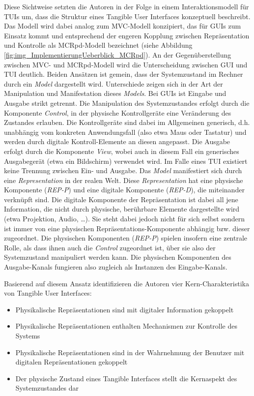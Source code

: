 Diese Sichtweise setzten die Autoren in der Folge in einem Interaktionsmodell für \glspl{TUI} um, dass die Struktur eines Tangible User Interfaces konzeptuell beschreibt. Das Modell wird dabei analog zum \gls{MVC}-Modell konzipiert, das für \glspl{GUI} zum Einsatz kommt und entsprechend der engeren Kopplung zwischen Repräsentation und Kontrolle als \gls{MCRpd}-Modell bezeichnet (siehe Abbildung \ref{fig:img_ImplementierungUeberblick_MCRpd}). An der Gegenüberstellung zwischen \gls{MVC}- und \gls{MCRpd}-Modell wird die Unterscheidung zwischen \gls{GUI} und \gls{TUI} deutlich. Beiden Ansätzen ist gemein, dass der Systemzustand im Rechner durch ein \emph{Model} dargestellt wird. Unterschiede zeigen sich in der Art der Manipulation und Manifestation dieses \emph{Models}. Bei \glspl{GUI} ist Eingabe und Ausgabe strikt getrennt. Die Manipulation des Systemzustandes erfolgt durch die Komponente \emph{Control}, in der physische Kontrollgeräte eine Veränderung des Zustandes erlauben. Die Kontrollgeräte sind dabei im Allgemeinen generisch, d.h. unabhängig vom konkreten Anwendungsfall (also etwa Maus oder Tastatur) und werden durch digitale Kontroll-Elemente an diesen angepasst. Die Ausgabe erfolgt durch die Komponente \emph{View}, wobei auch in diesem Fall ein generisches Ausgabegerät (etwa ein Bildschirm) verwendet wird. Im Falle eines \gls{TUI} existiert keine Trennung zwischen Ein- und Ausgabe. Das \emph{Model} manifestiert sich durch eine \emph{Representation} in der realen Welt. Diese \emph{Representation} hat eine physische Komponente (\emph{REP-P}) und eine digitale Komponente (\emph{REP-D}), die miteinander verknüpft sind. Die digitale Komponente der Repräsentation ist dabei all jene Information, die nicht durch physische, berührbare Elemente dargestellte wird (etwa Projektion, Audio, \ldots). Sie steht dabei jedoch nicht für sich selbst sondern ist immer von eine physischen Repräsentations-Komponente abhängig bzw. dieser zugeordnet. Die physischen Komponenten (\emph{REP-P}) spielen insofern eine zentrale Rolle, als dass ihnen auch die \emph{Control} zugeordnet ist, über sie also der Systemzustand manipuliert werden kann. Die physischen Komponenten des Ausgabe-Kanals fungieren also zugleich als Instanzen des Eingabe-Kanals.

Basierend auf diesem Ansatz identifizieren die Autoren vier Kern-Charakteristika von Tangible User Interfaces:
\begin{itemize}
	\item Physikalische Repräsentationen sind mit digitaler Information gekoppelt
	\item Physikalische Repräsentationen enthalten Mechanismen zur Kontrolle des Systems
	\item Physikalische Repräsentationen sind in der Wahrnehmung der Benutzer mit digitalen Repräsentationen gekoppelt
	\item Der physische Zustand eines Tangible Interfaces stellt die Kernaspekt des Systemzustandes dar
\end{itemize}


